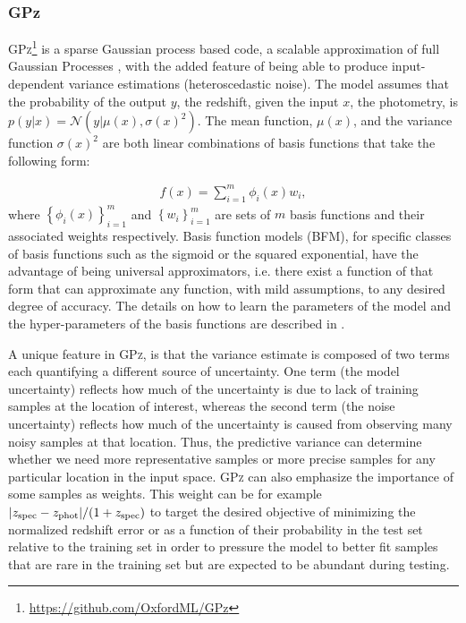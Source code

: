 \subsubsection{GPz}
\label{sec:gpz}

\textsc{GPz}\footnote{\url{https://github.com/OxfordML/GPz}} \citep{Almosallam:16a,Almosallam:15b} is a sparse Gaussian process based code, a scalable approximation of full Gaussian Processes \citep{Rasmussen:06}, with the added feature of being able to produce input-dependent variance estimations (heteroscedastic noise). The model assumes that the probability of the output $y$, the redshift, given the input $x$, the photometry, is $p(y|x)=\mathcal{N}\left(y|\mu(x),\sigma(x)^{2}\right)$. The mean function, $\mu(x)$, and the variance function $\sigma(x)^{2}$ are both linear combinations of basis functions that take the following form:

\begin{align}
f(x)=\sum_{i=1}^{m}\phi_{i}(x)w_{i},
\end{align}
where $\left\{\phi_{i}(x)\right\}_{i=1}^{m}$ and $\left\{w_{i}\right\}_{i=1}^{m}$ are sets of $m$ basis functions and their associated weights respectively. Basis function models (BFM), for specific classes of basis functions such as the sigmoid or the squared exponential, have the advantage of being universal approximators, i.e. there exist a function of that form that can approximate any function, with mild assumptions, to any desired degree of accuracy. The details on how to learn the parameters of the model and the hyper-parameters of the basis functions are described in \citet{Almosallam:15b}.

A unique feature in \textsc{GPz}, is that the variance estimate is composed of two terms each quantifying a different source of uncertainty. One term (the model uncertainty) reflects how much of the uncertainty is due to lack of training samples at the location of interest, whereas the second term (the noise uncertainty) reflects how much of the uncertainty is caused from observing many noisy samples at that location. Thus, the predictive variance can determine whether we need more representative samples or more precise samples for any particular location in the input space. \textsc{GPz} can also emphasize the importance of some samples as weights. This weight can be for example $|z_{\rm{spec}}-z_{\rm{phot}}|/(1+z_{\rm{spec}})$ to target the desired objective of minimizing the normalized redshift error or as a function of their probability in the test set relative to the training set in order to pressure the model to better fit samples that are rare in the training set but are expected to be abundant during testing.


